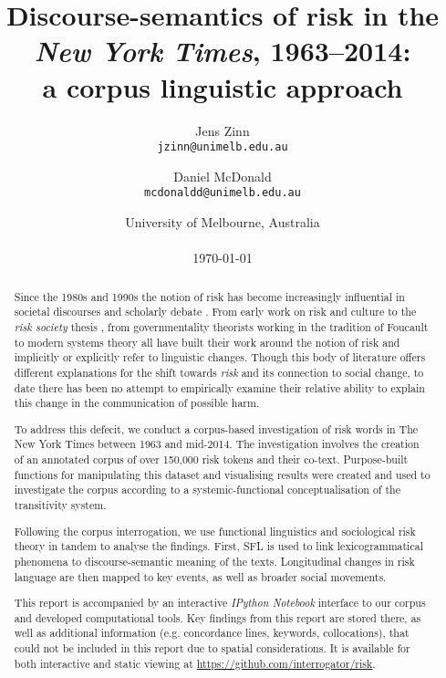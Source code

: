 \documentclass{report}
\title{Discourse-semantics of risk in the \emph{New York Times}, 1963--2014: \\ a corpus linguistic approach}
\author{
	Jens Zinn\\
	\texttt{jzinn@unimelb.edu.au}
	\and
	Daniel McDonald\\
	\texttt{mcdonaldd@unimelb.edu.au}\\
	}
\date{University of Melbourne, Australia\\
	~\\
	\today}
\begin{document}
		

	\renewcommand{\abstractname}{Abstract}

	\maketitle

\begin{abstract}

    Since the 1980s and 1990s the notion of risk has become increasingly influential in societal discourses and scholarly debate \cite{skolbekken_risk_1995}. From early work on risk and culture \cite{douglas_risk_1986,douglas_risk_2013} to the \emph{risk society} thesis \cite{beck_risk_1992,beck_world_2009,giddens_runaway_2002}, from governmentality theorists working in the tradition of Foucault \cite{dean_governmentality:_2010,omalley_risk_2012,rose_powers_1999} to modern systems theory \cite{luhmann_ecological_1989,luhmann_communication_1993} all have built their work around the notion of risk and implicitly or explicitly refer to linguistic changes. Though this body of literature offers different explanations for the shift towards \emph{risk} and its connection to social change, to date there has been no attempt to empirically examine their relative ability to explain this change in the communication of possible harm. 


	To address this defecit, we conduct a corpus-based investigation of risk words in The New York Times between 1963 and mid-2014. The investigation involves the creation of an annotated corpus of over 150,000 risk tokens and their co-text. Purpose-built functions for manipulating this dataset and visualising results were created and used to investigate the corpus according to a systemic-functional conceptualisation of the transitivity system.

    Following the corpus interrogation, we use functional linguistics and sociological risk theory in tandem to analyse the findings. First, SFL is used to link lexicogrammatical phenomena to discourse-semantic meaning of the texts. Longitudinal changes in risk language are then mapped to key events, as well as broader social movements.

    This report is accompanied by an interactive \emph{IPython Notebook} interface to our corpus and developed computational tools. Key findings from this report are stored there, as well as additional information (e.g. concordance lines, keywords, collocations), that could not be included in this report due to spatial considerations. It is available for both interactive and static viewing at \url{https://github.com/interrogator/risk}.

	\end{abstract}
\end{document}
